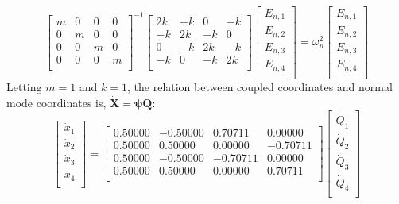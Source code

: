 \begin{equation}
\begin{bmatrix}
   m & 0 & 0 & 0 \\
   0 & m & 0 & 0 \\
   0 & 0 & m & 0 \\
   0 & 0 & 0 & m \\
\end{bmatrix}^{-1}
\begin{bmatrix}
   2k & -k & 0 & -k \\
   -k & 2k & -k & 0 \\
   0 & -k & 2k & -k \\
   -k & 0 & -k & 2k \\
\end{bmatrix}
\begin{bmatrix}
   E_{n,1} \\
   E_{n,2} \\
   E_{n,3} \\
   E_{n,4} \\
\end{bmatrix}
=\omega^2_n
\begin{bmatrix}
   E_{n,1} \\
   E_{n,2} \\
   E_{n,3} \\
   E_{n,4} \\
\end{bmatrix}
\end{equation}
Letting $m=1$ and $k=1$, the relation between coupled coordinates and normal mode coordinates is, $\pmb{\dot{X}}=\pmb{\psi}\pmb{\dot{Q}}$:
\begin{equation}
\begin{bmatrix}
   \dot{x}_1\\
   \dot{x}_2\\
   \dot{x}_3\\
   \dot{x}_4\\
\end{bmatrix}=
\begin{bmatrix}
  0.50000 & -0.50000  & 0.70711 & 0.00000 \\
  0.50000 &  0.50000 &  0.00000 & -0.70711 \\ 
  0.50000 & -0.50000 & -0.70711 & 0.00000  \\
  0.50000 &  0.50000 &  0.00000 & 0.70711  \\
\end{bmatrix}
\begin{bmatrix}
   \dot{Q}_1\\
   \dot{Q}_2\\
   \dot{Q}_3\\
   \dot{Q}_4\\
\end{bmatrix}
\end{equation}
